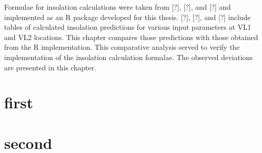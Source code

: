 Formulae for insolation calculations were taken from [?], [?], and [?] and implemented as an R package developed for this thesis. [?], [?], and [?] include tables of calculated insolation predictions for various input parameters at VL1 and VL2 locations. This chapter compares those predictions with those obtained from the R implementation. This comparative analysis served to verify the implementation of the insolation calculation formalae. The observed deviations are presented in this chapter.


\section{first}


\section{second}

